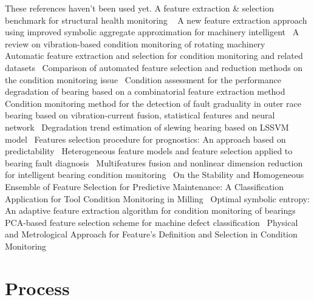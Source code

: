 \documentclass{article}
\begin{document}
These references haven't been used yet.
A feature extraction \& selection benchmark for structural health monitoring ~\cite{buckley2023feature}
A new feature extraction approach using improved symbolic aggregate approximation for machinery intelligent~\cite{zhang2019new}
A review on vibration-based condition monitoring of rotating machinery~\cite{tiboni2022review}
Automatic feature extraction and selection for condition monitoring and related datasets~\cite{schneider2018automatic}
Comparison of automated feature selection and reduction methods on the condition monitoring issue~\cite{de2018comparison}
Condition assessment for the performance degradation of bearing based on a combinatorial feature extraction method~\cite{hong2014condition}
Condition monitoring method for the detection of fault graduality in outer race bearing based on vibration-current fusion, statistical features and neural network~\cite{saucedo2021condition}
Degradation trend estimation of slewing bearing based on LSSVM model~\cite{lu2016degradation}
Features selection procedure for prognostics: An approach based on predictability~\cite{javed2012features}
Heterogeneous feature models and feature selection applied to bearing fault diagnosis~\cite{rauber2014heterogeneous}
Multifeatures fusion and nonlinear dimension reduction for intelligent bearing condition monitoring~\cite{guo2016multifeatures}
On the Stability and Homogeneous Ensemble of Feature Selection for Predictive Maintenance: A Classification Application for Tool Condition Monitoring in Milling~\cite{assafo2023stability}
Optimal symbolic entropy: An adaptive feature extraction algorithm for condition monitoring of bearings~\cite{li2023optimal}
PCA-based feature selection scheme for machine defect classification~\cite{malhi2004pca}
Physical and Metrological Approach for Feature’s Definition and Selection in Condition Monitoring~\cite{d2019physical}

\clearpage  
\section{Process}
\end{document}
